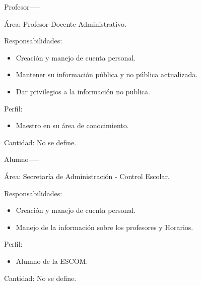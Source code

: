 \begin{actor}{Profesor}{-----}
	
	\item[Área:] Profesor-Docente-Administrativo.
	
	\item[Responsabilidades:] \hspace{1pt}
	    \begin{itemize}
	    	\item Creación y manejo de cuenta personal.
	    	\item Mantener su información pública y no pública actualizada.
	    	\item Dar privilegios a la información no publica.
	    \end{itemize}
	\item[Perfil:] \hspace{1pt}
	\begin{itemize}
		\item Maestro en su área de conocimiento.
	\end{itemize}
	\item[Cantidad:] No se define.
\end{actor}


\begin{actor}{Alumno}{-----}
	
	\item[Área:] Secretaría de Administración - Control Escolar.
	
	\item[Responsabilidades:] \hspace{1pt}
	\begin{itemize}
		\item Creación y manejo de cuenta personal.
		\item Manejo de la información sobre los profesores y Horarios.
		
	\end{itemize}
	\item[Perfil:] \hspace{1pt}
	\begin{itemize}
		\item Alumno de la ESCOM.
	\end{itemize}
	\item[Cantidad:] No se define.
\end{actor}



